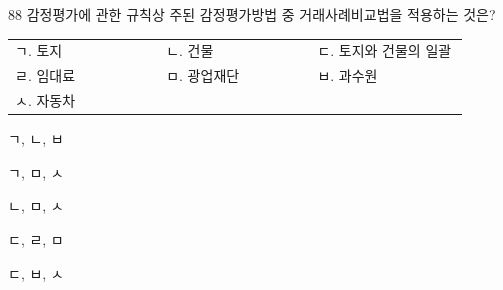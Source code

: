 \begin{question}{88}
감정평가에 관한 규칙상 주된 감정평가방법 중 거래사례비교법을 적용하는 것은?
\begin{framedtext}
\begin{tabular}{@{}p{0.3\linewidth}p{0.3\linewidth}p{0.3\linewidth}@{}}
ㄱ. 토지 & ㄴ. 건물 & ㄷ. 토지와 건물의 일괄 \\
ㄹ. 임대료 & ㅁ. 광업재단 & ㅂ. 과수원 \\
ㅅ. 자동차 & &
\end{tabular}
\end{framedtext}
\begin{choices}
  \item ㄱ, ㄴ, ㅂ
  \item ㄱ, ㅁ, ㅅ
  \item ㄴ, ㅁ, ㅅ
  \item ㄷ, ㄹ, ㅁ
  \item ㄷ, ㅂ, ㅅ
\end{choices}
\end{question}
